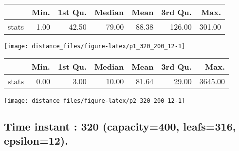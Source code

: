 \documentclass[
  9pt,
  landscape]{article}
\begin{document}
\begin{minipage}{0.5\textwidth} 
\centering 
\begin{tabular}{rrrrrrr}
  \hline
 & Min. & 1st Qu. & Median & Mean & 3rd Qu. & Max. \\ 
  \hline
stats & 1.00 & 42.50 & 79.00 & 88.38 & 126.00 & 301.00 \\ 
   \hline
\end{tabular}
\vspace{0.5cm} 


\texttt{[image: distance\_files/figure-latex/p1\_320\_200\_12-1]} 

\end{minipage} 
\begin{minipage}{0.5\textwidth} 
\centering 
\begin{tabular}{rrrrrrr}
  \hline
 & Min. & 1st Qu. & Median & Mean & 3rd Qu. & Max. \\ 
  \hline
stats & 0.00 & 3.00 & 10.00 & 81.64 & 29.00 & 3645.00 \\ 
   \hline
\end{tabular}
\vspace{0.5cm} 


\texttt{[image: distance\_files/figure-latex/p2\_320\_200\_12-1]} 

\end{minipage}

\pagebreak

\hypertarget{time-instant-320-capacity400-leafs316-epsilon12.}{%
\subsection{Time instant : 320 (capacity=400, leafs=316,
epsilon=12).}\label{time-instant-320-capacity400-leafs316-epsilon12.}}
\end{document}
